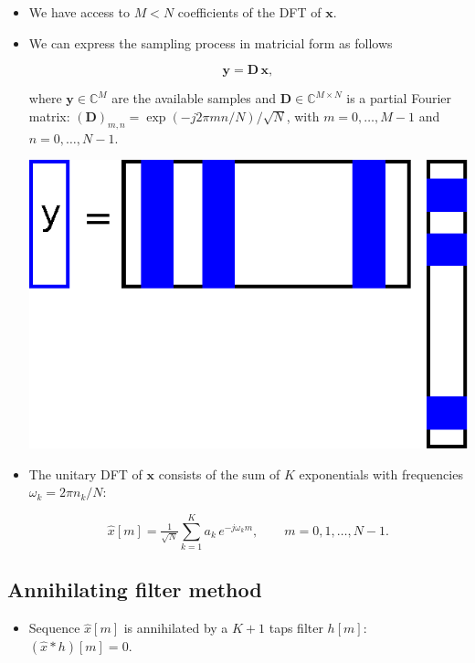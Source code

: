 \documentclass[a0,portrait]{a0poster}
\begin{document}
\begin{multicols}{2}
\begin{itemize}
\item We have access to $M<N$ coefficients of the DFT of $\bm{x}$. 

\item We can express the sampling process in matricial form as follows

\begin{equation}
\bm{y} = \bm{D} \, \bm{x},
\label{eq:under_y}
\end{equation}

\noindent 
where $\bm{y} \in \mathbb{C}^M$ are the available samples and $\bm{D} \in \mathbb{C}^{M \times N}$ 
is a partial Fourier matrix:
$\left(\bm{D}\right)_{m,n} = \exp \left(-j2\pi mn/N\right) / \sqrt{N}$,
with $m=0,\ldots,M-1$ and $n=0,\ldots,N-1$.

\begin{center}\vspace{1cm}
\includegraphics[width=0.4\linewidth]{matrix_mult_2}
\end{center}\vspace{1cm}

\item The unitary DFT of $\bm{x}$ 
consists of the sum of $K$ exponentials with frequencies $\omega_k = 2 \pi n_k / N$:

\begin{equation*}
\hat{x}[m] = \tfrac{1}{\sqrt{N}} \sum_{k=1}^K a_k \, e^{-j \omega_k m}, \qquad m = 0, 1, \ldots, N-1.
\end{equation*}

\end{itemize}


\subsection*{Annihilating filter method}

\begin{itemize}

\item Sequence $\hat{x}[m]$ is annihilated by a $K+1$ taps filter $h[m]$: $(\hat{x} * h)[m] = 0$.


\end{itemize}
\end{multicols}
\end{document}
